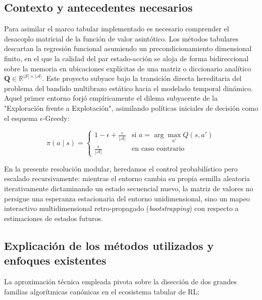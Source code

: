 \subsection{Contexto y antecedentes necesarios}
Para asimilar el marco tabular implementado es necesario comprender el desacoplo matricial de la función de valor asintótico. Los métodos tabulares descartan la regresión funcional asumiendo un precondicionamiento dimensional finito, en el que la calidad del par estado-acción se aloja de forma bidireccional sobre la memoria en ubicaciones explícitas de una matriz o diccionario analítico $\mathbf{Q} \in \mathbb{R}^{|\mathcal{S}| \times |\mathcal{A}|}$.
Este proyecto subyace bajo la transición directa hereditaria del problema del bandido multibrazo estático hacia el modelado temporal dinámico. Aquel primer entorno forjó empíricamente el dilema subyacente de la "Exploración frente a Explotación", asimilando políticas iniciales de decisión como el esquema $\epsilon$-Greedy:

\begin{equation}
\pi(a \mid s) = 
\begin{cases} 
1 - \epsilon + \frac{\epsilon}{|\mathcal{A}|} & \text{si } a = \arg\max_{a'} Q(s, a') \\
\frac{\epsilon}{|\mathcal{A}|} & \text{en caso contrario}
\end{cases}
\end{equation}

En la presente resolución modular, heredamos el control probabilístico pero escalado recursivamente: mientras el entorno cambia su propia semilla aleatoria iterativamente dictaminando un estado secuencial nuevo, la matriz de valores no persigue una esperanza estacionaria del entorno unidimensional, sino un mapeo interactivo multidimensional retro-propagado (\textit{bootstrapping}) con respecto a estimaciones de estados futuros.

\subsection{Explicación de los métodos utilizados y enfoques existentes}
La aproximación técnica empleada pivota sobre la disección de dos grandes familias algorítmicas canónicas en el ecosistema tabular de RL:


